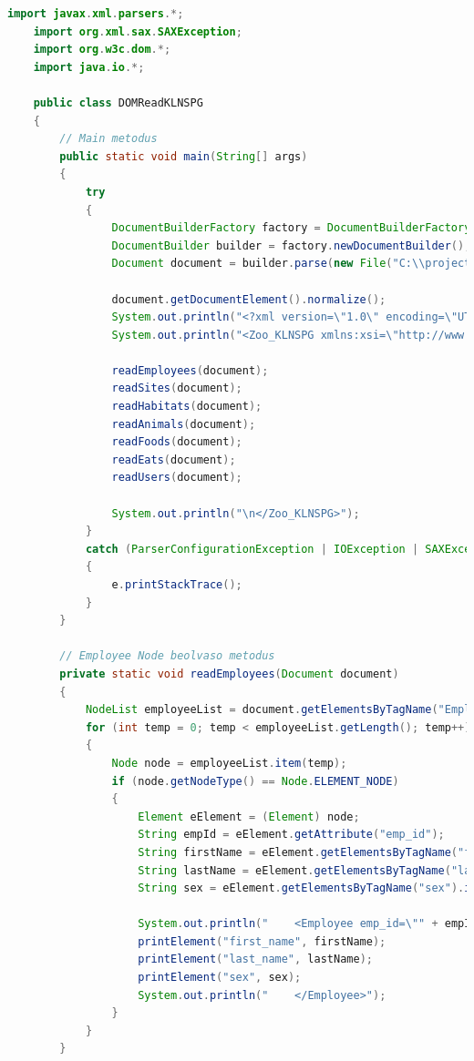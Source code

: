 \documentclass[12pt]{report}
\begin{document}
\begin{lstlisting}[caption={DOMReadKLNSPG.java} adatolvasó program, language=Java]
	import javax.xml.parsers.*;
	import org.xml.sax.SAXException;
	import org.w3c.dom.*;
	import java.io.*;
	
	public class DOMReadKLNSPG
	{
		// Main metodus
		public static void main(String[] args) 
		{
			try 
			{
				DocumentBuilderFactory factory = DocumentBuilderFactory.newInstance();
				DocumentBuilder builder = factory.newDocumentBuilder();
				Document document = builder.parse(new File("C:\\projects\\KLNSPG_XMLGyak\\XMLTaskKLNSPG\\XMLKLNSPG.xml"));
				
				document.getDocumentElement().normalize();
				System.out.println("<?xml version=\"1.0\" encoding=\"UTF-8\"?>\n");
				System.out.println("<Zoo_KLNSPG xmlns:xsi=\"http://www.w3.org/2001/XMLSchema-instance\" xsi:noNamespaceSchemaLocation=\"XMLSchemaKLNSPG.xsd\">\n");
				
				readEmployees(document);
				readSites(document);
				readHabitats(document);
				readAnimals(document);
				readFoods(document);
				readEats(document);
				readUsers(document);
				
				System.out.println("\n</Zoo_KLNSPG>");
			} 
			catch (ParserConfigurationException | IOException | SAXException e)
			{
				e.printStackTrace();
			}
		}
		
		// Employee Node beolvaso metodus
		private static void readEmployees(Document document) 
		{
			NodeList employeeList = document.getElementsByTagName("Employee");
			for (int temp = 0; temp < employeeList.getLength(); temp++) 
			{
				Node node = employeeList.item(temp);
				if (node.getNodeType() == Node.ELEMENT_NODE) 
				{
					Element eElement = (Element) node;
					String empId = eElement.getAttribute("emp_id");
					String firstName = eElement.getElementsByTagName("first_name").item(0).getTextContent();
					String lastName = eElement.getElementsByTagName("last_name").item(0).getTextContent();
					String sex = eElement.getElementsByTagName("sex").item(0).getTextContent();
					
					System.out.println("    <Employee emp_id=\"" + empId + "\">");
					printElement("first_name", firstName);
					printElement("last_name", lastName);
					printElement("sex", sex);
					System.out.println("    </Employee>");
				}
			}
		}
		

\end{lstlisting}
\end{document}
